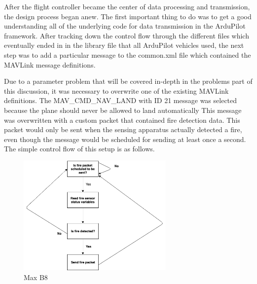 \documentclass[12pt,journal,compsoc]{IEEEtran}
\begin{document}
After the flight controller became the center of data processing and transmission, the design process began anew. The first important thing to do was to get a good understanding all of the underlying code for data transmission in the ArduPilot framework. After tracking down the control flow through the different files which eventually ended in in the library file that all ArduPilot vehicles used, the next step was to add a particular message to the common.xml file which contained the MAVLink message definitions. 

Due to a parameter problem that will be covered in-depth in the problems part of this discussion, it was necessary to overwrite one of the existing MAVLink definitions. The MAV\_CMD\_NAV\_LAND with ID 21 message was selected because the plane should never be allowed to land automatically This message was overwritten with a custom packet that contained fire detection data. This packet would only be sent when the sensing apparatus actually detected a fire, even though the message would be scheduled for sending at least once a second. The simple control flow of this setup is as follows.
\begin{figure}[h!]
\hspace*{0cm}
\centering
\includegraphics[width=3in]{Sending.png}
\caption{Max B8}
\label{sending}
\end{figure}
\end{document}
